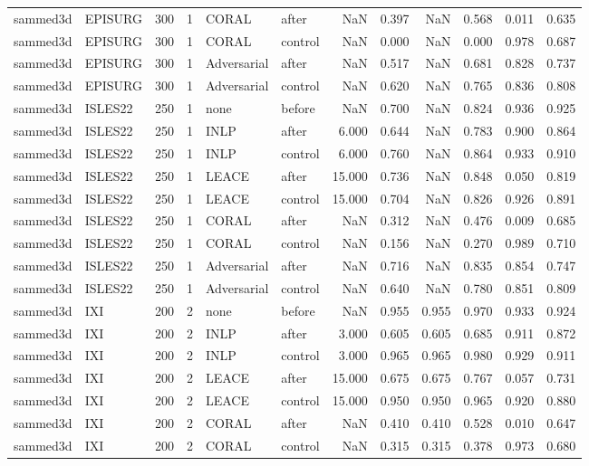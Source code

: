 \begin{tabular}{llrrllrrrrrr}
sammed3d & EPISURG & 300 & 1 & CORAL & after & NaN & 0.397 & NaN & 0.568 & 0.011 & 0.635 \\
sammed3d & EPISURG & 300 & 1 & CORAL & control & NaN & 0.000 & NaN & 0.000 & 0.978 & 0.687 \\
sammed3d & EPISURG & 300 & 1 & Adversarial & after & NaN & 0.517 & NaN & 0.681 & 0.828 & 0.737 \\
sammed3d & EPISURG & 300 & 1 & Adversarial & control & NaN & 0.620 & NaN & 0.765 & 0.836 & 0.808 \\
sammed3d & ISLES22 & 250 & 1 & none & before & NaN & 0.700 & NaN & 0.824 & 0.936 & 0.925 \\
sammed3d & ISLES22 & 250 & 1 & INLP & after & 6.000 & 0.644 & NaN & 0.783 & 0.900 & 0.864 \\
sammed3d & ISLES22 & 250 & 1 & INLP & control & 6.000 & 0.760 & NaN & 0.864 & 0.933 & 0.910 \\
sammed3d & ISLES22 & 250 & 1 & LEACE & after & 15.000 & 0.736 & NaN & 0.848 & 0.050 & 0.819 \\
sammed3d & ISLES22 & 250 & 1 & LEACE & control & 15.000 & 0.704 & NaN & 0.826 & 0.926 & 0.891 \\
sammed3d & ISLES22 & 250 & 1 & CORAL & after & NaN & 0.312 & NaN & 0.476 & 0.009 & 0.685 \\
sammed3d & ISLES22 & 250 & 1 & CORAL & control & NaN & 0.156 & NaN & 0.270 & 0.989 & 0.710 \\
sammed3d & ISLES22 & 250 & 1 & Adversarial & after & NaN & 0.716 & NaN & 0.835 & 0.854 & 0.747 \\
sammed3d & ISLES22 & 250 & 1 & Adversarial & control & NaN & 0.640 & NaN & 0.780 & 0.851 & 0.809 \\
sammed3d & IXI & 200 & 2 & none & before & NaN & 0.955 & 0.955 & 0.970 & 0.933 & 0.924 \\
sammed3d & IXI & 200 & 2 & INLP & after & 3.000 & 0.605 & 0.605 & 0.685 & 0.911 & 0.872 \\
sammed3d & IXI & 200 & 2 & INLP & control & 3.000 & 0.965 & 0.965 & 0.980 & 0.929 & 0.911 \\
sammed3d & IXI & 200 & 2 & LEACE & after & 15.000 & 0.675 & 0.675 & 0.767 & 0.057 & 0.731 \\
sammed3d & IXI & 200 & 2 & LEACE & control & 15.000 & 0.950 & 0.950 & 0.965 & 0.920 & 0.880 \\
sammed3d & IXI & 200 & 2 & CORAL & after & NaN & 0.410 & 0.410 & 0.528 & 0.010 & 0.647 \\
sammed3d & IXI & 200 & 2 & CORAL & control & NaN & 0.315 & 0.315 & 0.378 & 0.973 & 0.680 \\

\end{tabular}
